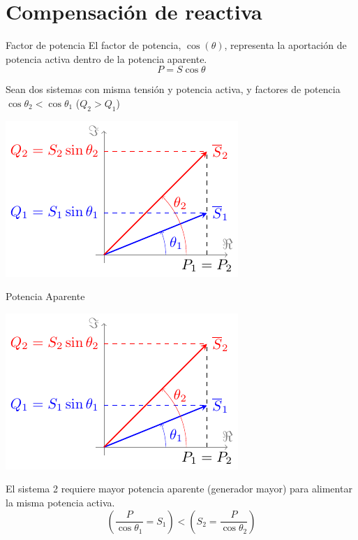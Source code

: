 \documentclass[aspectratio=169, usenames,svgnames,dvipsnames]{beamer}
\begin{document}
\section{Compensación de reactiva}
\label{sec:org190512f}

\begin{frame}[label={sec:orgf20cd39}]{Factor de potencia}
El factor de potencia, \(\cos(\theta)\), representa la aportación de potencia activa dentro de la potencia aparente.
\[
P = S \cos \theta
\]

Sean dos sistemas con \alert{misma tensión y potencia activa}, y factores de potencia \(\cos \theta_2 < \cos \theta_1\) (\(Q_2 > Q_1\))

\begin{center}
\includegraphics[height=0.5\textheight]{../figs/Fasores_CompensacionReactiva.pdf}
\end{center}
\end{frame}

\begin{frame}[label={sec:org4a4a2df}]{Potencia Aparente}
\begin{center}
\includegraphics[height=0.5\textheight]{../figs/Fasores_CompensacionReactiva.pdf}
\end{center}


El sistema 2 requiere \alert{mayor potencia aparente} (generador mayor) para alimentar la misma potencia activa.
\[
  \left(\frac{P}{\cos \theta_1} = S_1 \right) < \left( S_2 = \frac{P}{\cos \theta_2}\right) 
\]
\end{frame}
\end{document}
